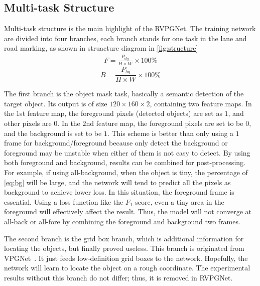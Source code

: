 \begin{spacing}{1.5}
\subsection{Multi-task Structure}
\label{subsec:multitask}

Multi-task structure is the main highlight of the RVPGNet. The training network are divided into four branches, each branch stands for one task in the lane and road marking, as shown in struacture diagram in \autoref{fig:structure}
\begin{align}
    F = \frac{P_{obj}}{H \times W} \times 100\% \label{eq:fore}
\end{align}
\vspace{-7mm}
\begin{equation}
    B = \frac{P_{bg}}{H \times W} \times 100\% \label{eq:bg}
\end{equation}

The first branch is the object mask task, basically a semantic detection of the target object. Its output is of size $120 \times 160 \times 2$, containing two feature maps. In the $1$st feature map, the foreground pixels (detected objects) are set as $1$, and other pixels are $0$. In the $2$nd feature map, the foreground pixels are set to be $0$, and the background is set to be $1$. This scheme is better than only using a $1$ frame for background/foreground because only detect the background or foreground may be unstable when either of them is not easy to detect. By using both foreground and background, results can be combined for post-processing. For example, if using all-background, when the object is tiny, the percentage of \autoref{eq:bg} will be large, and the network will tend to predict all the pixels as background to achieve lower loss. In this situation, the foreground frame is essential. Using a loss function like the $F_1$ score, even a tiny area in the foreground will effectively affect the result. Thus, the model will not converge at all-back or all-fore by combining the foreground and background two frames.

The second branch is the grid box branch, which is additional information for locating the objects, but finally proved useless. This branch is originated from VPGNet~\cite{lee2017vpgnet}. It just feeds low-definition grid boxes to the network. Hopefully, the network will learn to locate the object on a rough coordinate. The experimental results without this branch do not differ; thus, it is removed in RVPGNet.


\end{spacing}
